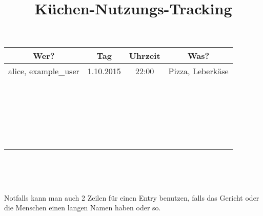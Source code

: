 \documentclass{article}
\begin{document}
\title{K{\"u}chen-Nutzungs-Tracking}

\maketitle

\begin{tabular}{|c|c|c|c|}
  \hline
  {\hspace{4em}}Wer?{\hspace{5em}} &  Tag & Uhrzeit & Was?\\
  \hline
  alice, example\_user & 1.10.2015 & 22:00 & Pizza, Leberk{\"a}se\\
  \hline
  &  &  & \\
  \hline
  &  &  & \\
  \hline
  &  &  & \\
  \hline
  &  &  & \\
  \hline
  &  &  & \\
  \hline
  &  &  & \\
  \hline
  &  &  & \\
  \hline
  &  &  & \\
  \hline
  &  &  & \\
  \hline
  &  &  & \\
  \hline
  &  &  & \\
  \hline
  &  &  & \\
  \hline
  &  &  & \\
  \hline
  &  &  & \\
  \hline
  &  &  & \\
  \hline
  &  &  & \\
  \hline
  &  &  & \\
  \hline
  &  &  & \\
  \hline
  &  &  & \\
  \hline
  &  &  & \\
  \hline
  &  &  & \\
  \hline
  &  &  & \\
  \hline
  &  &  & \\
  \hline
\end{tabular}

\

\

Notfalls kann man auch 2 Zeilen f{\"u}r einen Entry benutzen, falls das
Gericht oder die Menschen einen langen Namen haben oder so.
\end{document}
